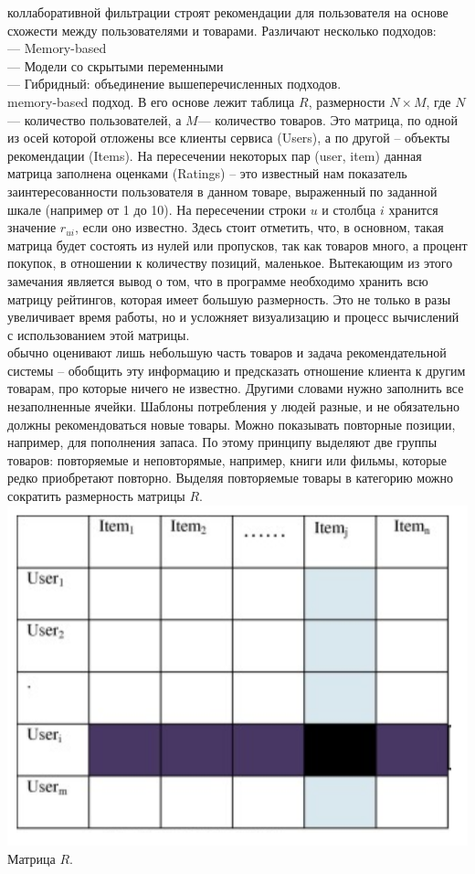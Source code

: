 \documentclass{article}
\newcommand\tab[1][1cm]{\hspace*{#1}}
\begin{document}
 коллаборативной фильтрации строят рекомендации для пользователя на основе схожести между пользователями и товарами. Различают несколько подходов:\\
\tab— Memory-based\\
\tab— Модели со скрытыми переменными\\
\tab— Гибридный: объединение вышеперечисленных подходов.\\
 memory-based подход. В его основе лежит таблица $R$, ﻿размерности $N\times M$, где ﻿$N$﻿ — количество пользователей, а $M$— количество товаров. Это матрица, по одной из осей которой отложены все клиенты сервиса (Users), а по другой – объекты рекомендации (Items). На пересечении некоторых пар (user, item) данная матрица заполнена оценками (Ratings) – это известный нам показатель заинтересованности пользователя в данном товаре, выраженный по заданной шкале (например от 1 до 10). На пересечении строки $u$ и столбца ﻿$i$﻿ хранится значение ﻿$r_{ui}$﻿, если оно известно. Здесь стоит отметить, что, в основном, такая матрица будет состоять из нулей или пропусков, так как товаров много, а процент покупок, в отношении к количеству позиций, маленькое. Вытекающим из этого замечания является вывод о том, что в программе необходимо хранить всю матрицу рейтингов, которая имеет большую размерность. Это не только в разы увеличивает время работы, но и усложняет визуализацию и процесс вычислений с использованием этой матрицы. \\
 обычно оценивают лишь небольшую часть товаров и задача рекомендательной системы – обобщить эту информацию и предсказать отношение клиента к другим товарам, про которые ничего не известно. Другими словами нужно заполнить все незаполненные ячейки. Шаблоны потребления у людей разные, и не обязательно должны рекомендоваться новые товары. Можно показывать повторные позиции, например, для пополнения запаса. По этому принципу выделяют две группы товаров: повторяемые и неповторямые, например, книги или фильмы, которые редко приобретают повторно. Выделяя повторяемые товары в категорию можно сократить размерность матрицы $R$.
 \includegraphics[width=\linewidth]{f2.png}\\
 Матрица $R$.
\end{document}
